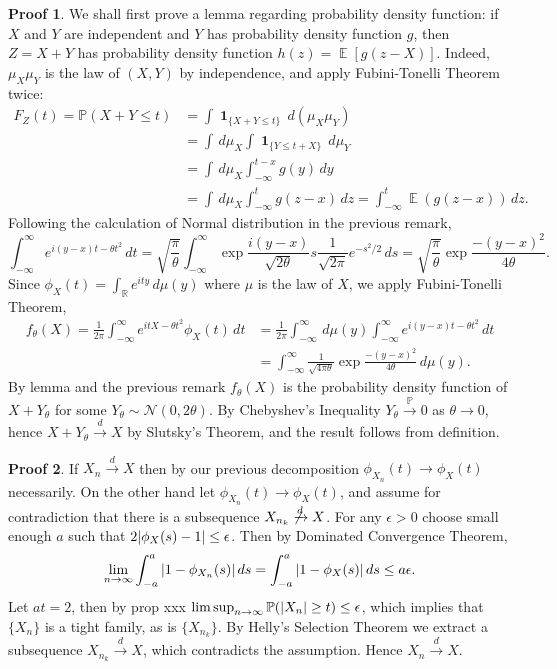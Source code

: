 \documentclass[hidelinks,11pt]{article}
\theoremstyle{definition}
\theoremstyle{dotless}
\newtheorem{prop}{Proof}[section]
\theoremstyle{remark}
\DeclareMathOperator{\E}{\mathbb{E}}
\DeclareMathOperator{\1}{\mathbf{1}}
\begin{document}
\begin{prop}
We shall first prove a lemma regarding probability density function: if $X$ and $Y$ are independent and $Y$ has probability density function $g$, then $Z=X+Y$ has probability density function $h(z)=\E[g(z-X)]$.\smallbreak
Indeed, $\mu_X\mu_Y$ is the law of $(X,Y)$ by independence, and apply Fubini-Tonelli Theorem twice:
\begin{align*}
F_Z(t)=\mathbb{P}(X+Y\leq t)&=\int\1_{\{X+Y\leq t\}}\,d(\mu_X\mu_Y)\\
&=\int\,d\mu_X\int\1_{\{Y\leq t+X\}}\,d\mu_Y\\
&=\int\,d\mu_X\int_{-\infty}^{t-x}g(y)\,dy\\
&=\int\,d\mu_X\int_{-\infty}^tg(z-x)\,dz=\int_{-\infty}^t\E(g(z-x))\,dz.
\end{align*}
Following the calculation of Normal distribution in the previous remark,
\[\int_{-\infty}^\infty e^{i(y-x)t-\theta t^2}\,dt=\sqrt{\frac{\pi}{\theta}}\int_{-\infty}^\infty\exp{\frac{i(y-x)}{\sqrt{2\theta}}s}\frac{1}{\sqrt{2\pi}}e^{-s^2/2}\,ds=\sqrt{\frac{\pi}{\theta}}\exp{\frac{-(y-x)^2}{4\theta}}.\]
Since $\phi_X(t)=\int_\mathbb{R}e^{ity}\,d\mu(y)$ where $\mu$ is the law of $X$, we apply Fubini-Tonelli Theorem,
\begin{align*}
f_\theta(X)=\frac{1}{2\pi}\int_{-\infty}^\infty e^{itX-\theta t^2}\phi_X(t)\,dt&=\frac{1}{2\pi}\int_{-\infty}^\infty\,d\mu(y)\int_{-\infty}^\infty e^{i(y-x)t-\theta t^2}\,dt\\&=\int_{-\infty}^\infty\frac{1}{\sqrt{4\pi\theta}}\exp{\frac{-(y-x)^2}{4\theta}}\,d\mu(y).
\end{align*}
By lemma and the previous remark $f_\theta(X)$ is the probability density function of $X+Y_\theta$ for some $Y_\theta\sim \mathcal{N}(0,2\theta)$. By Chebyshev's Inequality $Y_\theta\xrightarrow{\mathbb{P}}0$ as $\theta\to0$, hence $X+Y_\theta\xrightarrow{d}X$ by Slutsky's Theorem, and the result follows from definition.
\end{prop}

\begin{prop}
If $X_n\xrightarrow{d}X$ then by our previous decomposition $\phi_{X_n}(t)\to\phi_X(t)$ necessarily.\smallbreak
On the other hand let $\phi_{X_n}(t)\to\phi_X(t)$, and assume for contradiction that there is a subsequence $X_{n_k}\not\xrightarrow{d}X$. For any $\epsilon>0$ choose small enough $a$ such that $2\abs{\phi_X(s)-1}\leq\epsilon$. Then by Dominated Convergence Theorem,
\[\lim_{n\to\infty}\int_{-a}^a\abs{1-\phi_{X_n}(s)}\,ds=\int_{-a}^a\abs{1-\phi_X(s)}\,ds\leq a\epsilon.\]
Let $at=2$, then by prop xxx $\limsup_{n\to\infty}\mathbb{P}(\abs{X_n}\geq t)\leq\epsilon$, which implies that $\{X_n\}$ is a tight family, as is $\{X_{n_k}\}$. By Helly's Selection Theorem we extract a subsequence $X_{n_k}\xrightarrow{d}X$, which contradicts the assumption. Hence $X_n\xrightarrow{d}X$.
\end{prop}
\end{document}
